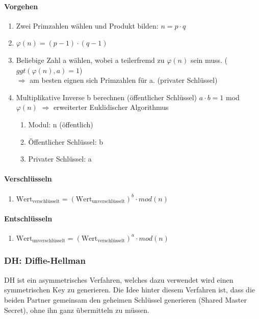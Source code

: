 \paragraph{Vorgehen}
\begin{enumerate}
	\item Zwei Primzahlen wählen und Produkt bilden: $n = p \cdot q$
	\item $\varphi(n) = (p - 1) \cdot (q - 1)$
	\item Beliebige Zahl a wählen, wobei a teilerfremd zu $\varphi(n)$ sein muss. ($ggt(\varphi(n), a) = 1$) \\ $\Rightarrow$ am besten eignen sich Primzahlen für a. (privater Schlüssel)
	\item Multiplikative Inverse b berechnen (öffentlicher Schlüssel) $a \cdot b = 1$ mod $\varphi(n)$ $\Rightarrow$ erweiterter Euklidischer Algorithmus
	\begin{enumerate}
		\item Modul: n (öffentlich)
		\item Öffentlicher Schlüssel: b
		\item Privater Schlüssel: a
	\end{enumerate}	
\end{enumerate}

\paragraph{Verschlüsseln}
\begin{enumerate}
	\item $\text{Wert}_\text{verschlüsselt} = (\text{Wert}_\text{unverschlüsselt})^{b} \cdot mod(n)$
\end{enumerate}

\paragraph{Entschlüsseln}
\begin{enumerate}
	\item $\text{Wert}_\text{unverschlüsselt} = (\text{Wert}_\text{verschlüsselt})^{a} \cdot mod(n)$
\end{enumerate}

\newpage

\subsubsection{DH: Diffie-Hellman}
DH ist ein asymmetrisches Verfahren, welches dazu verwendet wird einen symmetrischen Key zu generieren. Die Idee 
hinter diesem Verfahren ist, dass die beiden Partner gemeinsam den geheimen Schlüssel generieren (Shared Master Secret), ohne ihn 
ganz übermitteln zu müssen.

